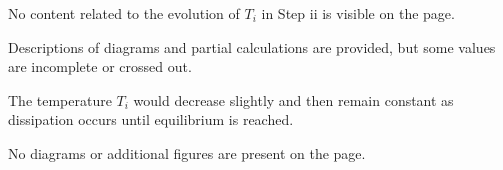 No content related to the evolution of \(T_i\) in Step ii is visible on the page.  

Descriptions of diagrams and partial calculations are provided, but some values are incomplete or crossed out.

The temperature \( T_i \) would decrease slightly and then remain constant as dissipation occurs until equilibrium is reached.  

No diagrams or additional figures are present on the page.